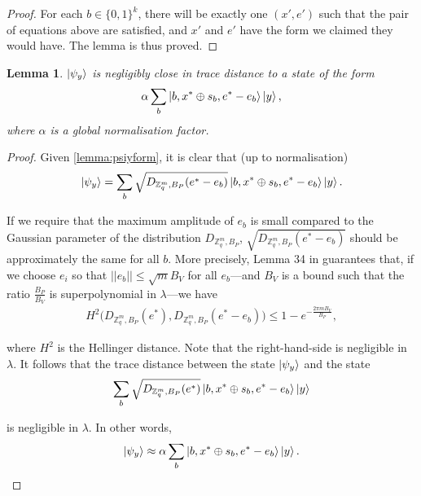 \documentclass{article}
\newtheorem{lemma}{Lemma}[section]
\begin{document}
\begin{itemize}
\begin{proof}
		For each $b \in \{0,1\}^k$, there will be exactly one $(x', e')$ such that the pair of equations above are satisfied, and $x'$ and $e'$ have the form we claimed they would have. The lemma is thus proved. \end{proof}

\begin{lemma} \label{lemma:globalnorm}
$\ket{\psi_y}$ is negligibly close in trace distance to a state of the form
\begin{align}
\alpha \sum_b \ket{b, x^* \oplus s_b, e^* - e_b} \ket{y},
\end{align}
where $\alpha$ is a global normalisation factor.
\end{lemma}
\begin{proof}
		Given \cref{lemma:psiyform}, it is clear that (up to normalisation)
		\begin{align}
			\ket{\psi_y} = \sum_b \sqrt{D_{\mathbb{Z}_q^m, B_P}(e^* - e_b)} \ket{b, x^* \oplus s_b, e^* - e_b} \ket{y}.
		\end{align}

		If we require that the maximum amplitude of $e_b$ is small compared to the Gaussian parameter of the distribution $D_{\mathbb{Z}_q^m, B_P}$, $\sqrt{D_{\mathbb{Z}_q^m, B_P}(e^* - e_b)}$ should be approximately the same for all $b$. More precisely, Lemma 34 in \cite{randomness} guarantees that, if we choose $e_i$ so that $||e_b|| \leq \sqrt{m} B_V$ for all $e_b$---and $B_V$ is a bound such that the ratio $\frac{B_P}{B_V}$ is superpolynomial in $\lambda$---we have
\begin{align}
	H^2\big( D_{\mathbb{Z}_q^m, B_P}(e^*), D_{\mathbb{Z}_q^m, B_P}(e^* - e_b) \big) \leq 1 - e^{-\frac{2\pi m B_V}{B_P}},
\end{align}

where $H^2$ is the Hellinger distance. Note that the right-hand-side is negligible in $\lambda$. It follows that the trace distance between the state $\ket{\psi_y}$ and the state
		\begin{align}
			\sum_b \sqrt{D_{\mathbb{Z}_q^m, B_P}(e^*)} \ket{b, x^* \oplus s_b, e^* - e_b} \ket{y}
		\end{align}

is negligible in $\lambda$. In other words,
		\begin{align}
			\ket{\psi_y} \approx \alpha \sum_b \ket{b, x^* \oplus s_b, e^* - e_b} \ket{y}.
		\end{align}
\end{proof}
\end{itemize}
\end{document}

